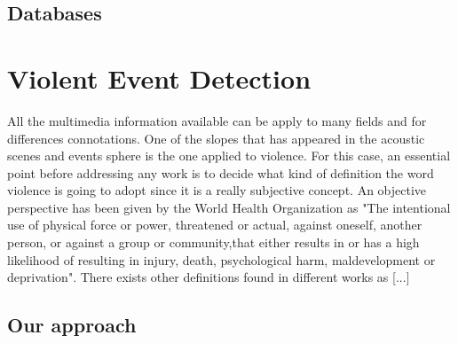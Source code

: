 \subsection{Databases}

\section{Violent Event Detection}
All the multimedia information available can be apply to many fields and for differences connotations. One of the slopes that has appeared in the acoustic scenes and events sphere is the one applied to violence. For this case, an essential point before addressing any work is to decide what kind of definition the word violence is going to adopt since it is a really subjective concept. An objective perspective has been given by the World Health Organization as "The  intentional  use  of physical  force  or  power,  threatened  or  actual,  against oneself, another person, or against a group or community,that either results in or has a high likelihood of resulting in injury,  death,  psychological  harm,  maldevelopment  or deprivation"\cite{Krug2002}. There exists other definitions found in different works as [...]


\subsection{Our approach}

